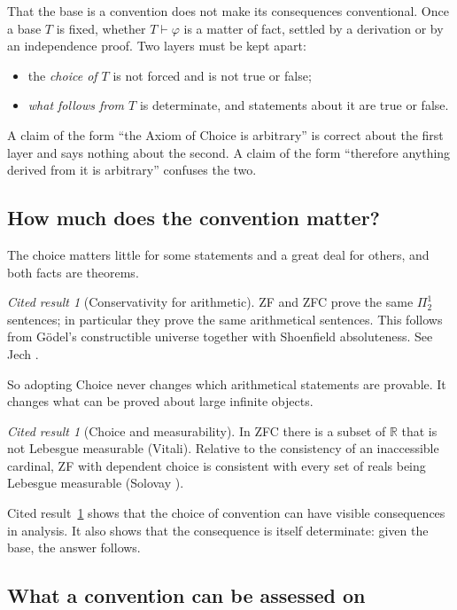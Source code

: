 \documentclass[11pt]{article}
\theoremstyle{definition}
\theoremstyle{plain}
\theoremstyle{remark}
\newtheorem{cited}[definition]{Cited result}
\begin{document}
That the base is a convention does not make its consequences conventional. Once a base $T$ is fixed, whether $T\vdash\varphi$ is a matter of fact, settled by a derivation or by an independence proof. Two layers must be kept apart:
\begin{itemize}
\item the \emph{choice of $T$} is not forced and is not true or false;
\item \emph{what follows from $T$} is determinate, and statements about it are true or false.
\end{itemize}
A claim of the form ``the Axiom of Choice is arbitrary'' is correct about the first layer and says nothing about the second. A claim of the form ``therefore anything derived from it is arbitrary'' confuses the two.

\subsection{How much does the convention matter?}

The choice matters little for some statements and a great deal for others, and both facts are theorems.

\begin{cited}[Conservativity for arithmetic]\label{cit:shoenfield}
ZF and ZFC prove the same $\Pi^1_2$ sentences; in particular they prove the same arithmetical sentences. This follows from G\"odel's constructible universe together with Shoenfield absoluteness. See Jech \cite[Ch.~13 and Ch.~25]{Jech03}.
\end{cited}

So adopting Choice never changes which arithmetical statements are provable. It changes what can be proved about large infinite objects.

\begin{cited}[Choice and measurability]\label{cit:vitali}
In ZFC there is a subset of $\mathbb{R}$ that is not Lebesgue measurable (Vitali). Relative to the consistency of an inaccessible cardinal, ZF with dependent choice is consistent with every set of reals being Lebesgue measurable (Solovay \cite{Solovay70}).
\end{cited}

Cited result~\ref{cit:vitali} shows that the choice of convention can have visible consequences in analysis. It also shows that the consequence is itself determinate: given the base, the answer follows.

\subsection{What a convention can be assessed on}
\end{document}
